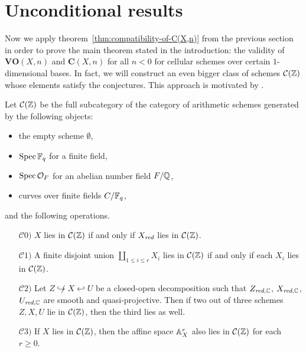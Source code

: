 \documentclass{article}
\numberwithin{equation}{section}
\begin{document}

\section{Unconditional results}
\label{sec:unconditional-results}

Now we apply theorem~\ref{thm:compatibility-of-C(X,n)} from the previous section
in order to prove the main theorem stated in the introduction: the validity of
$\mathbf{VO} (X,n)$ and $\mathbf{C} (X,n)$ for all $n < 0$ for cellular schemes
over certain $1$-dimensional bases. In fact, we will construct an even bigger
class of schemes $\mathcal{C} (\ZZ)$ whose elements satisfy the conjectures.
This approach is motivated by \cite[\S 5]{Morin-2014}.

\begin{definition}
  Let $\mathcal{C} (\ZZ)$ be the full subcategory of the category of arithmetic
  schemes generated by the following objects:
  \begin{itemize}
  \item the empty scheme $\emptyset$,
  \item $\Spec \FF_q$ for a finite field,
  \item $\Spec \mathcal{O}_F$ for an abelian number field $F/\QQ$,
  \item curves over finite fields $C/\FF_q$,
  \end{itemize}
  and the following operations.
  \begin{enumerate}
  \item[$\mathcal{C}0)$] $X$ lies in $\mathcal{C} (\ZZ)$ if and only if $X_\red$
    lies in $\mathcal{C} (\ZZ)$.

  \item[$\mathcal{C}1)$] A finite disjoint union $\coprod_{1 \le i \le r} X_i$
    lies in $\mathcal{C} (\ZZ)$ if and only if each $X_i$ lies in
    $\mathcal{C} (\ZZ)$.

  \item[$\mathcal{C}2)$] Let $Z \not\hookrightarrow X \hookleftarrow U$ be a
    closed-open decomposition such that
    $Z_{\red,\CC}$, $X_{\red,\CC}$, $U_{\red,\CC}$ are smooth and
    quasi-projective. Then if two out of three schemes $Z,X,U$ lie in
    $\mathcal{C} (\ZZ)$, then the third lies as well.

  \item[$\mathcal{C}3)$] If $X$ lies in $\mathcal{C} (\ZZ)$, then the affine
    space $\AA^r_X$ also lies in $\mathcal{C} (\ZZ)$ for each $r \ge 0$.
  \end{enumerate}
\end{definition}
\end{document}
